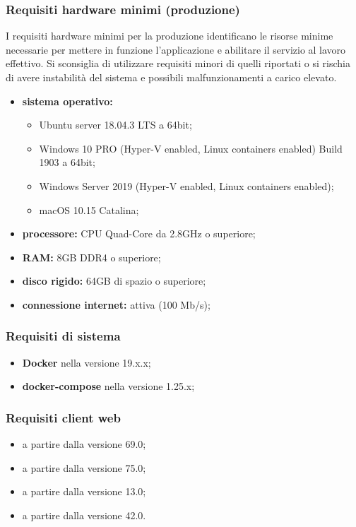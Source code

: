 	\subsubsection{Requisiti hardware minimi (produzione)}
	I requisiti hardware minimi per la produzione identificano le risorse minime necessarie per mettere in funzione l'applicazione e abilitare il servizio al lavoro effettivo. Si sconsiglia di utilizzare requisiti minori di quelli riportati o si rischia di avere instabilità del sistema e possibili malfunzionamenti a carico elevato.
		\begin{itemize}
			\item \textbf{sistema operativo:} 
			\begin{itemize}
				\item Ubuntu server 18.04.3 LTS a 64bit;
				\item Windows 10 PRO (Hyper-V enabled, Linux containers enabled) Build 1903 a 64bit; 
				\item Windows Server 2019 (Hyper-V enabled, Linux containers enabled);
				\item macOS 10.15 Catalina;
			\end{itemize}
			\item \textbf{processore:} CPU Quad-Core da 2.8GHz o superiore;
			\item \textbf{RAM:} 8GB DDR4 o superiore;
			\item \textbf{disco rigido:} 64GB di spazio o superiore;
			\item \textbf{connessione internet:} attiva (100 Mb/s);
		\end{itemize}
	\subsubsection{Requisiti di sistema}
		\begin{itemize}
			\item \textbf{Docker} nella versione 19.x.x;
			\item \textbf{docker-compose} nella versione 1.25.x;
		\end{itemize}
	\subsubsection{Requisiti client web}
		\begin{itemize}
		 	\item {} a partire dalla versione 69.0;
		 	\item {} a partire dalla versione 75.0;
		 	\item {} a partire dalla versione 13.0;
		 	\item {} a partire dalla versione 42.0.
		\end{itemize} 
